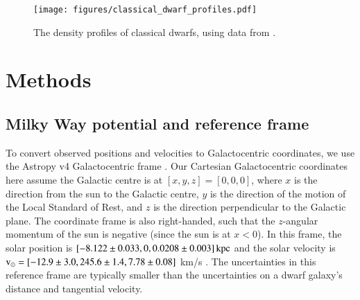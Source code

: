 \documentclass{aa}
\newcommand{\V}{{\rm v}}
\newcommand{\kpc}{{\rm kpc}}
\begin{document}
\begin{figure}
    \centering
    \texttt{[image: figures/classical\_dwarf\_profiles.pdf]}
    {\caption{The density profiles of classical dwarfs, using data from \citet{jensen+2024}.}}
    \label{fig:observed_density_profiles}
\end{figure}

\section{Methods}

\subsection{Milky Way potential and reference frame}\label{milky-way-potential}
To convert observed positions and velocities to Galactocentric
coordinates, we use the Astropy v4 Galactocentric frame
\citep{astropycollaboration+2022}. Our Cartesian Galactocentric
coordinates here assume the Galactic centre is at
\([x, y, z] = [0,0,0]\), where \(x\) is the direction from the sun to
the Galactic centre, \(y\) is the direction of the motion of the Local
Standard of Rest, and \(z\) is the direction perpendicular to the
Galactic plane. The coordinate frame is also right-handed, such that the
\(z\)-angular momentum of the sun is negative (since the sun is at
\(x<0\)). In this frame, the solar position is
\([-8.122 \pm 0.033, 0, 0.0208 \pm 0.003]\, \kpc\)
\citep{gravitycollaboration+2018, bennett+bovy2019} and the solar
velocity is \(\V_\odot = [-12.9 \pm 3.0, 245.6 \pm 1.4, 7.78 \pm 0.08]\)
km/s
\citep{reid+brunthaler2004, drimmel+poggio2018, gravitycollaboration+2018}.
The uncertainties in this reference frame are typically smaller than the
uncertainties on a dwarf galaxy's distance and tangential velocity.
\end{document}
